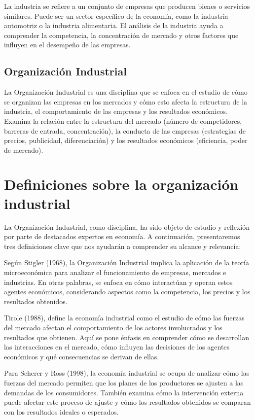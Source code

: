 \documentclass[
  doc,
  floatsintext,
  longtable,
  a4paper,
  nolmodern,
  notxfonts,
  notimes,
  12pt,
  colorlinks=true,linkcolor=blue,citecolor=blue,urlcolor=blue]{apa7}
\begin{document}
La industria se refiere a un conjunto de empresas que producen bienes o
servicios similares. Puede ser un sector específico de la economía, como
la industria automotriz o la industria alimentaria. El análisis de la
industria ayuda a comprender la competencia, la concentración de mercado
y otros factores que influyen en el desempeño de las empresas.

\subsection{Organización Industrial}\label{organizaciuxf3n-industrial}

La Organización Industrial es una disciplina que se enfoca en el estudio
de cómo se organizan las empresas en los mercados y cómo esto afecta la
estructura de la industria, el comportamiento de las empresas y los
resultados económicos. Examina la relación entre la estructura del
mercado (número de competidores, barreras de entrada, concentración), la
conducta de las empresas (estrategias de precios, publicidad,
diferenciación) y los resultados económicos (eficiencia, poder de
mercado).

\section{Definiciones sobre la organización
industrial}\label{definiciones-sobre-la-organizaciuxf3n-industrial}

La Organización Industrial, como disciplina, ha sido objeto de estudio y
reflexión por parte de destacados expertos en economía. A continuación,
presentaremos tres definiciones clave que nos ayudarán a comprender su
alcance y relevancia:

Según Stigler (1968), la Organización Industrial implica la aplicación
de la teoría microeconómica para analizar el funcionamiento de empresas,
mercados e industrias. En otras palabras, se enfoca en cómo interactúan
y operan estos agentes económicos, considerando aspectos como la
competencia, los precios y los resultados obtenidos.

Tirole (1988), define la economía industrial como el estudio de cómo las
fuerzas del mercado afectan el comportamiento de los actores
involucrados y los resultados que obtienen. Aquí se pone énfasis en
comprender cómo se desarrollan las interacciones en el mercado, cómo
influyen las decisiones de los agentes económicos y qué consecuencias se
derivan de ellas.

Para Scherer y Ross (1998), la economía industrial se ocupa de analizar
cómo las fuerzas del mercado permiten que los planes de los productores
se ajusten a las demandas de los consumidores. También examina cómo la
intervención externa puede afectar este proceso de ajuste y cómo los
resultados obtenidos se comparan con los resultados ideales o esperados.
\end{document}
